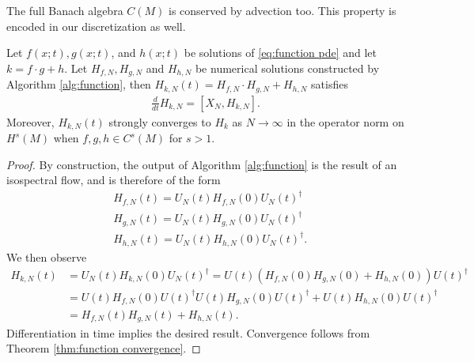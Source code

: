 \documentclass[final,leqno]{siamart}
\begin{document}
The full Banach algebra $C(M)$ is conserved by advection too.
This property is encoded in our discretization as well.
\begin{theorem} \label{thm:algebra}
	Let $f(x;t),g(x;t)$, and $h(x;t)$ be solutions of \eqref{eq:function pde} and let $k= f \cdot g + h $.
	Let $H_{f,N}, H_{g,N}$ and $H_{h,N}$ be numerical solutions constructed by Algorithm \ref{alg:function}, then $H_{k,N}(t) = H_{f,N}\cdot H_{g,N}+H_{h,N}$
	satisfies
	\begin{align*}
		\frac{d}{dt} H_{k,N} = [ X_{N} , H_{k,N}].
	\end{align*}
	Moreover, $H_{k,N}(t)$ strongly converges to $H_{k}$ as $N \to \infty$ in the operator norm on $H^{s}(M)$ when $f,g,h \in C^{s}(M)$ for $s>1$.
\end{theorem}
\begin{proof}
	By construction, the output of Algorithm \ref{alg:function} is the result of an isospectral flow, and is therefore of the form 
	\begin{align*}
		&H_{f,N}(t) = U_{N}(t) H_{f,N}(0) U_{N}(t)^{\dagger} \\
		&H_{g,N}(t) = U_{N}(t) H_{g,N}(0) U_{N}(t)^{\dagger} \\
		&H_{h,N}(t) = U_{N}(t) H_{h,N}(0) U_{N}(t)^{\dagger}.
	\end{align*}
	We then observe
	\begin{align*}
		H_{k,N}(t) &= U_{N}(t) H_{k,N}(0) U_{N}(t)^{\dagger} = U(t)\left( H_{f,N}(0) H_{g,N}(0) + H_{h,N}(0) \right) U(t)^{\dagger} \\
			&= U(t)H_{f,N}(0) U(t)^{\dagger} U(t) H_{g,N}(0)U(t)^{\dagger} + U(t) H_{h,N}(0) U(t)^{\dagger} \\
			&=H_{f,N}(t)H_{g,N}(t) + H_{h,N}(t).
	\end{align*}
	Differentiation in time implies the desired result.
	Convergence follows from Theorem \ref{thm:function convergence}.
\end{proof}
\end{document}
